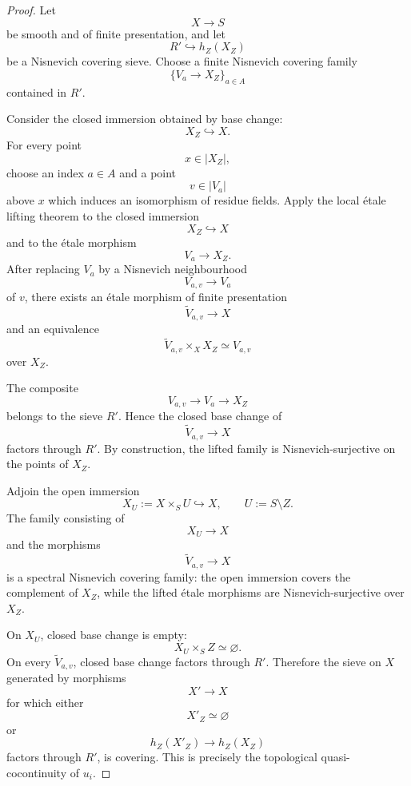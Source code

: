 \begin{proof}
Let
\[
    X
    \longrightarrow
    S
\]
be smooth and of finite presentation, and let
\[
    R'
    \hookrightarrow
    h_Z(X_Z)
\]
be a Nisnevich covering sieve.  Choose a finite Nisnevich covering
family
\[
    \{V_a\to X_Z\}_{a\in A}
\]
contained in \(R'\).

Consider the closed immersion obtained by base change:
\[
    X_Z
    \hookrightarrow
    X.
\]
For every point
\[
    x\in|X_Z|,
\]
choose an index \(a\in A\) and a point
\[
    v\in|V_a|
\]
above \(x\) which induces an isomorphism of residue fields.  Apply the
local étale lifting theorem
to the closed immersion
\[
    X_Z
    \hookrightarrow
    X
\]
and to the étale morphism
\[
    V_a
    \longrightarrow
    X_Z.
\]
After replacing \(V_a\) by a Nisnevich neighbourhood
\[
    V_{a,v}
    \longrightarrow
    V_a
\]
of \(v\), there exists an étale morphism of finite presentation
\[
    \widetilde V_{a,v}
    \longrightarrow
    X
\]
and an equivalence
\[
    \widetilde V_{a,v}\times_XX_Z
    \simeq
    V_{a,v}
\]
over \(X_Z\).

The composite
\[
    V_{a,v}
    \longrightarrow
    V_a
    \longrightarrow
    X_Z
\]
belongs to the sieve \(R'\).  Hence the closed base change of
\[
    \widetilde V_{a,v}
    \longrightarrow
    X
\]
factors through \(R'\).  By construction, the lifted family is
Nisnevich-surjective on the points of \(X_Z\).

Adjoin the open immersion
\[
    X_U
    :=
    X\times_SU
    \hookrightarrow
    X,
    \qquad
    U:=S\setminus Z.
\]
The family consisting of
\[
    X_U
    \longrightarrow
    X
\]
and the morphisms
\[
    \widetilde V_{a,v}
    \longrightarrow
    X
\]
is a spectral Nisnevich covering family: the open immersion covers the
complement of \(X_Z\), while the lifted étale morphisms are
Nisnevich-surjective over \(X_Z\).

On \(X_U\), closed base change is empty:
\[
    X_U\times_SZ
    \simeq
    \varnothing.
\]
On every \(\widetilde V_{a,v}\), closed base change factors through
\(R'\).  Therefore the sieve on \(X\) generated by morphisms
\[
    X'\longrightarrow X
\]
for which either
\[
    X'_Z
    \simeq
    \varnothing
\]
or
\[
    h_Z(X'_Z)
    \longrightarrow
    h_Z(X_Z)
\]
factors through \(R'\), is covering.  This is precisely the
topological quasi-cocontinuity of \(u_i\).
\end{proof}

